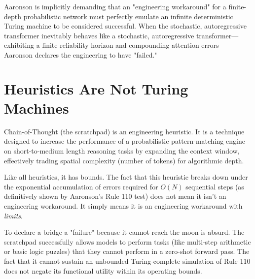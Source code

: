 \documentclass[12pt,a4paper]{article}
\begin{document}
Aaronson is implicitly demanding that an "engineering workaround" for a finite-depth probabilistic network must perfectly emulate an infinite deterministic Turing machine to be considered successful. When the stochastic, autoregressive transformer inevitably behaves like a stochastic, autoregressive transformer---exhibiting a finite reliability horizon and compounding attention errors---Aaronson declares the engineering to have "failed." 

\section{Heuristics Are Not Turing Machines}

Chain-of-Thought (the scratchpad) is an engineering heuristic. It is a technique designed to increase the performance of a probabilistic pattern-matching engine on short-to-medium length reasoning tasks by expanding the context window, effectively trading spatial complexity (number of tokens) for algorithmic depth.

Like all heuristics, it has bounds. The fact that this heuristic breaks down under the exponential accumulation of errors required for $O(N)$ sequential steps (as definitively shown by Aaronson's Rule 110 test) does not mean it isn't an engineering workaround. It simply means it is an engineering workaround with \emph{limits}.

To declare a bridge a "failure" because it cannot reach the moon is absurd.  The scratchpad successfully allows models to perform tasks (like multi-step arithmetic or basic logic puzzles) that they cannot perform in a zero-shot forward pass. The fact that it cannot sustain an unbounded Turing-complete simulation of Rule 110 does not negate its functional utility within its operating bounds.

\end{document}
